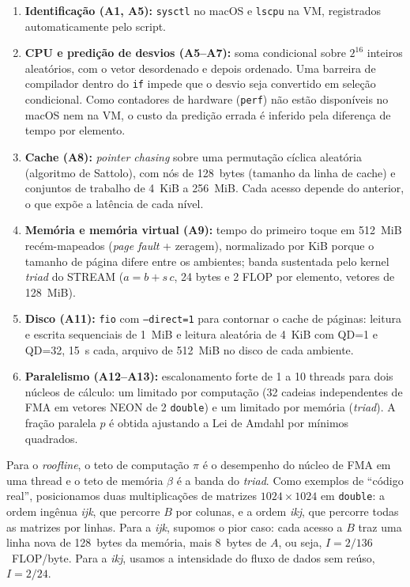 \documentclass[12pt]{article}
\begin{document}
\begin{enumerate}
  \item \textbf{Identificação (A1, A5):} \texttt{sysctl} no macOS e
    \texttt{lscpu} na VM, registrados automaticamente pelo script.
  \item \textbf{CPU e predição de desvios (A5--A7):} soma condicional sobre
    $2^{16}$ inteiros aleatórios, com o vetor desordenado e depois ordenado.
    Uma barreira de compilador dentro do \texttt{if} impede que o desvio seja
    convertido em seleção condicional. Como contadores de hardware
    (\texttt{perf}) não estão disponíveis no macOS nem na VM, o custo da
    predição errada é inferido pela diferença de tempo por elemento.
  \item \textbf{Cache (A8):} \emph{pointer chasing} sobre uma permutação
    cíclica aleatória (algoritmo de Sattolo), com nós de 128~bytes (tamanho da
    linha de cache) e conjuntos de trabalho de 4~KiB a 256~MiB. Cada acesso
    depende do anterior, o que expõe a latência de cada nível.
  \item \textbf{Memória e memória virtual (A9):} tempo do primeiro toque em
    512~MiB recém-mapeados (\emph{page fault} + zeragem), normalizado por KiB
    porque o tamanho de página difere entre os ambientes; banda sustentada pelo
    kernel \emph{triad} do STREAM ($a = b + s\,c$, 24 bytes e 2 FLOP por
    elemento, vetores de 128~MiB).
  \item \textbf{Disco (A11):} \texttt{fio} com \texttt{--direct=1} para
    contornar o cache de páginas: leitura e escrita sequenciais de 1~MiB e
    leitura aleatória de 4~KiB com QD=1 e QD=32, 15~s cada, arquivo de 512~MiB
    no disco de cada ambiente.
  \item \textbf{Paralelismo (A12--A13):} escalonamento forte de 1 a 10
    threads para dois núcleos de cálculo: um limitado por computação (32 cadeias
    independentes de FMA em vetores NEON de 2 \texttt{double}) e um limitado por
    memória (\emph{triad}). A fração paralela $p$ é obtida ajustando a Lei de
    Amdahl por mínimos quadrados.
\end{enumerate}

Para o \emph{roofline}, o teto de computação $\pi$ é o desempenho do núcleo de
FMA em uma thread e o teto de memória $\beta$ é a banda do \emph{triad}. Como
exemplos de ``código real'', posicionamos duas multiplicações de matrizes
$1024 \times 1024$ em \texttt{double}: a ordem ingênua \emph{ijk}, que percorre
$B$ por colunas, e a ordem \emph{ikj}, que percorre todas as matrizes por linhas.
Para a \emph{ijk}, supomos o pior caso: cada acesso a $B$ traz uma linha nova de
128~bytes da memória, mais 8~bytes de $A$, ou seja, $I = 2/136$~FLOP/byte. Para
a \emph{ikj}, usamos a intensidade do fluxo de dados sem reúso, $I = 2/24$.
\end{document}
